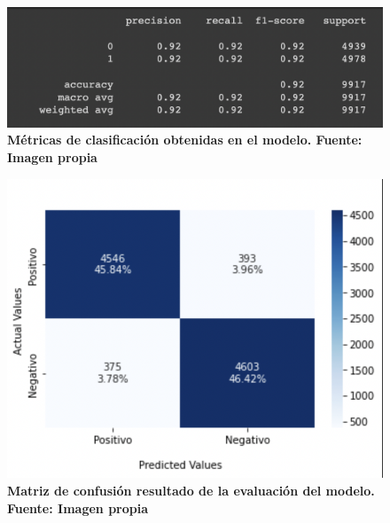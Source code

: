 \begin{figure}[ht!]
    \centering
    \includegraphics[scale=0.6]{figuras/as-resultados-2.png}
    \caption[Análisis de Sentimiento - Resultados - Métricas de clasificación]{\textbf{Métricas de clasificación obtenidas en el modelo. Fuente: Imagen propia}}
    \label{fig-as-resultados-2}
\end{figure}

\begin{figure}[ht!]
    \centering
    \includegraphics[scale=0.6]{figuras/as-resultados-3.png}
    \caption[Análisis de Sentimiento - Resultados - Matriz de confusión]{\textbf{Matriz de confusión resultado de la evaluación del modelo. Fuente: Imagen propia}}
    \label{fig-as-resultados-3}
\end{figure}
